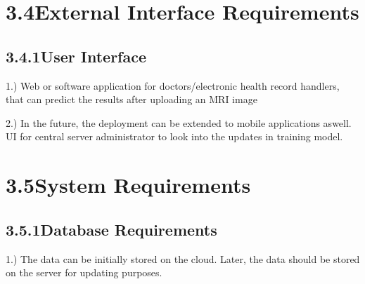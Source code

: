 \documentclass[oneside,a4paper,12pt]{book}
\begin{document}
\vspace{\baselineskip}
\section*{3.4\hspace*{10pt}External Interface Requirements}
\subsection*{3.4.1\hspace*{10pt}User Interface}
\item
1.) Web or software application for doctors/electronic health record handlers, that can predict the results after uploading an MRI image
\item
2.) In the future, the deployment can be extended to mobile applications aswell. UI for central server administrator to look into the updates in training model.
\vspace{\baselineskip}
\section*{3.5\hspace*{10pt}System Requirements}
\subsection*{3.5.1\hspace*{10pt}Database Requirements}
 1.)	The data can be initially stored on the cloud. Later, the data should be stored on the server for updating purposes.\par
\newpage
\end{document}
